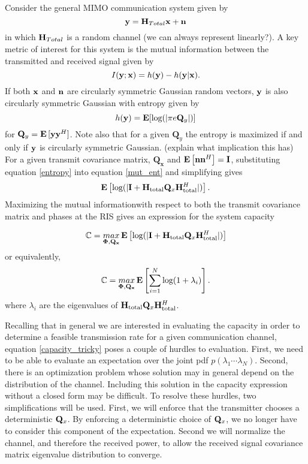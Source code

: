Consider the general MIMO communication system given by 
	\begin{equation}\label{com_system}
	\mathbf{y} = \mathbf{H}_{Total}\mathbf{x} + \mathbf{n}
	\end{equation}
	in which $\mathbf{H}_{Total}$ is a random channel (we can always represent linearly?).
A key metric of interest for this system is the mutual information between the transmitted and received signal given by 
\begin{equation}\label{mut_ent}
I(\mathbf{y};\mathbf{x}) = h(\mathbf{y}) - h(\mathbf{y}|\mathbf{x}).
\end{equation}
If both $\mathbf{x}$ and $\mathbf{n}$ are circularly symmetric Gaussian random vectors, $\mathbf{y}$ is also circularly symmetric Gaussian with entropy given by \cite{telatar1999capacity} 
\begin{equation}\label{entropy}
h(\mathbf{y}) = \mathop{\bf E{}}[\text{log{}}(|\pi e \mathbf{Q}_{y}|)]
\end{equation}
 for $\mathbf{Q}_{y} = \mathop{\bf E{}}{[\mathbf{y} \mathbf{y}^H]}$. Note also that for a given $\mathbf{Q}_{y}$ the entropy is maximized if and only if $\mathbf{y}$ is circularly symmetric Gaussian. (explain what implication this has)
For a given transmit covariance matrix, $\mathbf{Q_x}$ and $\mathop{\bf E{}}\left[\mathbf{n}\mathbf{n}^H \right] = \mathbf{I}$, substituting equation \eqref{entropy} into equation
\eqref{mut_ent} and simplifying gives
\begin{equation}\label{mut_inf}
\mathop{\bf E{}} \left[\text{log{}}(|\mathbf{I} + \mathbf{H}_\text{total} \mathbf{Q}_x \mathbf{H}_\text{total}^H|)\right].
\end{equation}
Maximizing the mutual informationwith respect to both the
transmit covariance matrix and phases at the RIS gives an expression for the system capacity

\begin{equation}\label{capacity}
\mathbb{C} = \underset{\boldsymbol{\Phi},\mathbf{Q_x}}{\mathop{max}} \mathop{\bf E{}} \left[\text{log{}}(|\mathbf{I} + \mathbf{H}_\text{total} \mathbf{Q}_x \mathbf{H}_\text{total}^H|)\right]
\end{equation}
or equivalently,
\begin{equation}\label{capacity_tricky}
\mathbb{C} = \underset{\boldsymbol{\Phi},\mathbf{Q_x}}{\mathop{max}} \mathop{\bf E{}} \left[\sum_{i=1}^{N}\text{log{}}(1 + \lambda_i)\right].
\end{equation}
where $\lambda_i$ are the eigenvalues of $\mathbf{H}_\text{total} \mathbf{Q}_x \mathbf{H}_\text{total}^H$.

Recalling that in general we are interested in evaluating the capacity in order to determine a feasible transmission rate for a given communication channel, equation \eqref{capacity_tricky} poses a couple of hurdles to evaluation. First, we need to be able to evaluate an expectation over the joint pdf $p(\lambda_1 \cdots	 \lambda_N)$. Second, there is an optimization problem whose solution may in general depend on the distribution of the channel. Including this solution in the capacity expression without a closed form may be difficult.
To resolve these hurdles, two simplifications will be used.
First, we will enforce that the transmitter chooses a deterministic $\mathbf{Q}_x$. 
By enforcing a deterministic choice of $\mathbf{Q}_x$, we no longer have to consider this component of the expectation.
Second we will normalize the channel, and therefore the received power, to allow the received signal covariance matrix eigenvalue distribution to converge. 

